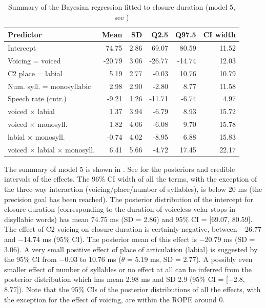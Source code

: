 \documentclass[
  12pt,
  a4paper,
]{article}
\begin{document}
\begin{table}[t]

\caption{\label{tab:clos-5-table}Summary of the Bayesian regression fitted to closure duration (model 5, see )}
\centering
\fontsize{8}{10}\selectfont
\begin{tabular}{lrrrrr}
\toprule
Predictor & Mean & SD & Q2.5 & Q97.5 & CI width\\
\midrule
Intercept & 74.75 & 2.86 & 69.07 & 80.59 & 11.52\\
Voicing = voiced & -20.79 & 3.06 & -26.77 & -14.74 & 12.03\\
C2 place = labial & 5.19 & 2.77 & -0.03 & 10.76 & 10.79\\
Num. syll. = monosyllabic & 2.98 & 2.90 & -2.80 & 8.77 & 11.58\\
Speech rate (cntr.) & -9.21 & 1.26 & -11.71 & -6.74 & 4.97\\
voiced × labial & 1.37 & 3.94 & -6.79 & 8.93 & 15.72\\
voiced × monosyll. & 1.82 & 4.06 & -6.08 & 9.70 & 15.78\\
labial × monosyll. & -0.74 & 4.02 & -8.95 & 6.88 & 15.83\\
voiced × labial × monosyll. & 6.41 & 5.66 & -4.72 & 17.45 & 22.17\\
\bottomrule
\end{tabular}
\end{table}

The summary of model 5 is shown in . See
 for the posteriors and credible intervals of
the effects. The 96\% CI width of all the terms, with the exception of
the three-way interaction (voicing/place/number of syllables), is below
20 ms (the precision goal has been reached). The posterior distribution
of the intercept for closure duration (corresponding to the duration of
voiceless velar stops in disyllabic words) has mean 74.75 ms (SD = 2.86)
and 95\% CI = {[}69.07, 80.59{]}. The effect of C2 voicing on closure
duration is certainly negative, between −26.77 and −14.74 ms (95\% CI).
The posterior mean of this effect is −20.79 ms (SD = 3.06). A very small
positive effect of place of articulation (labial) is suggested by the
95\% CI from −0.03 to 10.76 ms (\(\bar{\theta}\) = 5.19 ms, SD = 2.77).
A possibly even smaller effect of number of syllables or no effect at
all can be inferred from the posterior distribution which has mean 2.98
ms and SD 2.9 (95\% CI = {[}−2.8, 8.77{]}). Note that the 95\% CIs of
the posterior distributions of all the effects, with the exception for
the effect of voicing, are within the ROPE around 0.
\end{document}
